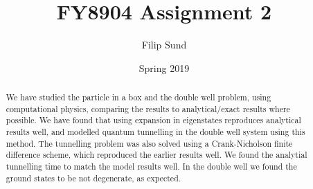 \documentclass[a4paper,twocolumn]{article}
\title{FY8904 Assignment 2}
\date{Spring 2019}
\author{Filip Sund}
\newcommand{\cpp}{\texttt{C++}}
\newcommand{\cppeleven}{\texttt{C++11}}
\begin{document}
\maketitle

\begin{abstract}
    We have studied the particle in a box and the double well problem, using computational physics, comparing the results to analytical/exact results where possible. We have found that using expansion in eigenstates reproduces analytical results well, and modelled quantum tunnelling in the double well system using this method. The tunnelling problem was also solved using a Crank-Nicholson finite difference scheme, which reproduced the earlier results well. We found the analytial tunnelling time to match the model results well. In the double well we found the ground states to be not degenerate, as expected.
\end{abstract}

\end{document}
